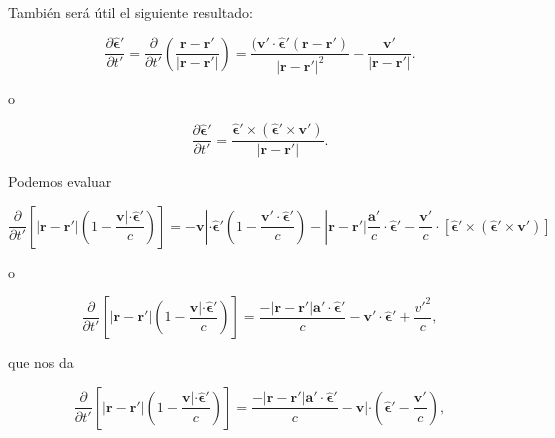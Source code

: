 \documentclass[a4paper,11pt]{article}
\numberwithin{equation}{section}
\begin{document}
También será útil el siguiente resultado:

\begin{equation}
 \frac{\partial \hat{\mathbf{\epsilon}}'}{\partial t'} = 
 \frac{\partial}{\partial t'}\left(\frac{\mathbf{r} - \mathbf{r}'}{|\mathbf{r} - \mathbf{r}'|}\right) = 
 \frac{(\mathbf{v}' \cdot \hat{\mathbf{\epsilon}}'(\mathbf{r} - \mathbf{r}')}{|\mathbf{r} - \mathbf{r}'|^2} 
 - \frac{\mathbf{v}'}{|\mathbf{r} - \mathbf{r}'|}.
\end{equation}

o 

\begin{equation}
 \frac{\partial \hat{\mathbf{\epsilon}}'}{\partial t'} = \frac{\hat{\mathbf{\epsilon}}' 
 \times (\hat{\mathbf{\epsilon}}' \times \mathbf{v}')}{|\mathbf{r} - \mathbf{r}'|}.
\end{equation}

Podemos evaluar 

\begin{equation*}
 \frac{\partial}{\partial t'}\left[|\mathbf{r} - \mathbf{r}'| \left(1 - 
 \frac{\mathbf{v}| \cdot  \hat{\mathbf{\epsilon}}'}{c}\right) \right] = 
 - \mathbf{v}| \cdot  \hat{\mathbf{\epsilon}}' \left(1 - 
 \frac{\mathbf{v}' \cdot  \hat{\mathbf{\epsilon}}'}{c}\right) - 
 |\mathbf{r} - \mathbf{r}'|\frac{\mathbf{a}'}{c}\cdot \hat{\mathbf{\epsilon}}' 
 - \frac{\mathbf{v}'}{c}\cdot \left[\hat{\mathbf{\epsilon}}' \times
 (\hat{\mathbf{\epsilon}}' \times \mathbf{v}')\right]
\end{equation*}

o

\begin{equation}
  \frac{\partial}{\partial t'}\left[|\mathbf{r} - \mathbf{r}'| \left(1 - 
 \frac{\mathbf{v}| \cdot  \hat{\mathbf{\epsilon}}'}{c}\right) \right] = 
 \frac{-|\mathbf{r} - \mathbf{r}'|\mathbf{a}' \cdot \hat{\mathbf{\epsilon}}'}{c} 
 - \mathbf{v}' \cdot \hat{\mathbf{\epsilon}}' + \frac{v'^2}{c},
\end{equation}

que nos da 

\begin{equation}
  \frac{\partial}{\partial t'}\left[|\mathbf{r} - \mathbf{r}'| \left(1 - 
 \frac{\mathbf{v}| \cdot  \hat{\mathbf{\epsilon}}'}{c}\right) \right] = 
 \frac{-|\mathbf{r} - \mathbf{r}'|\mathbf{a}' \cdot \hat{\mathbf{\epsilon}}'}{c} 
 - \mathbf{v}| \cdot \left(\hat{\mathbf{\epsilon}}' - \frac{\mathbf{v}'}{c} \right),
\end{equation}
\end{document}
